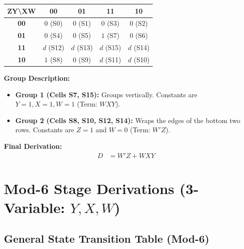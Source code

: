 \documentclass[journal,12pt,onecolumn]{IEEEtran}
\begin{document}
		\begin{table}[H]
			\centering
			\begin{tabular}{|c|c|c|c|c|}
				\hline
				\textbf{ZY\textbackslash XW} & \textbf{00} & \textbf{01} & \textbf{11} & \textbf{10} \\
				\hline
				\textbf{00} & $0$ (S0) & $0$ (S1) & $0$ (S3) & $0$ (S2) \\
				\hline
				\textbf{01} & $0$ (S4) & $0$ (S5) & \cellcolor{grpRed}$1$ (S7) & $0$ (S6) \\
				\hline
				\textbf{11} & \cellcolor{grpGreen}$d$ (S12) & $d$ (S13) & \cellcolor{grpRed}$d$ (S15) & \cellcolor{grpGreen}$d$ (S14) \\
				\hline
				\textbf{10} & \cellcolor{grpGreen}$1$ (S8) & $0$ (S9) & $d$ (S11) & \cellcolor{grpGreen}$d$ (S10) \\
				\hline
			\end{tabular}
		\end{table}
		
		\begin{justify}
			\textbf{Group Description:}
			\begin{itemize}
				\item \textbf{Group 1 (Cells S7, S15):} Groups vertically. Constants are $Y=1, X=1, W=1$ (Term: $WXY$).
				\item \textbf{Group 2 (Cells S8, S10, S12, S14):} Wraps the edges of the bottom two rows. Constants are $Z=1$ and $W=0$ (Term: $W'Z$).
			\end{itemize}
			
			\textbf{Final Derivation:}
			\begin{align}
				D &= W'Z + WXY
			\end{align}
		\end{justify}
		
		\newpage
		\section{\textbf{ Mod-6 Stage Derivations (3-Variable: $Y, X, W$)}}
		\vspace{1em}
		\subsection{General State Transition Table (Mod-6)}
		
\end{document}
